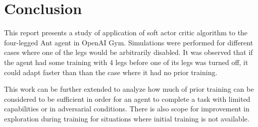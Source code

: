 \documentclass[conference]{IEEEtran}
\begin{document}
\section{Conclusion}\label{secConclusion}
This report presents a study of application of soft actor critic algorithm to the four-legged Ant agent in OpenAI Gym. Simulations were performed for different cases where one of the legs would be arbitrarily disabled. It was observed that if the agent had some training with 4 legs before one of its legs was turned off, it could adapt faster than than the case where it had no prior training.

This work can be further extended to analyze how much of prior training can be considered to be sufficient in order for an agent to complete a task with limited capabilities or in adversarial conditions. There is also scope for improvement in exploration during training for situations where initial training is not available.
\\



\vspace{12pt}
\end{document}
